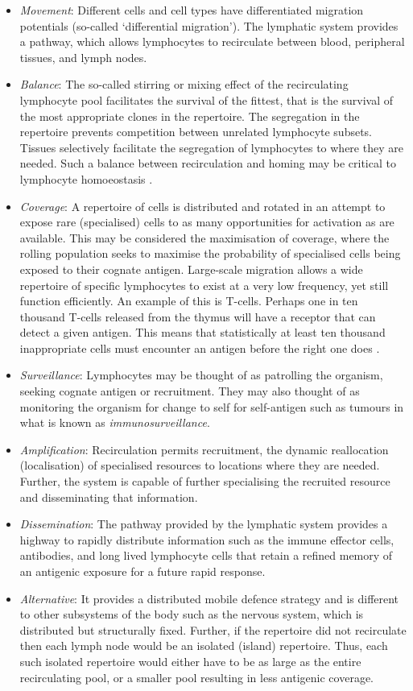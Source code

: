 \begin{itemize}
	\item \emph{Movement}: Different cells and cell types have differentiated migration potentials (so-called `differential migration'). The lymphatic system provides a pathway, which allows lymphocytes to recirculate between blood, peripheral tissues, and lymph nodes.
	\item \emph{Balance}: The so-called stirring or mixing effect of the recirculating lymphocyte pool facilitates the survival of the fittest, that is the survival of the most appropriate clones in the repertoire. The segregation in the repertoire prevents competition between unrelated lymphocyte subsets. Tissues selectively facilitate the segregation of lymphocytes to where they are needed. Such a balance between recirculation and homing may be critical to lymphocyte homoeostasis \cite{Butcher1996}.
	\item \emph{Coverage}: A repertoire of cells is distributed and rotated in an attempt to expose rare (specialised) cells to as many opportunities for activation as are available. This may be considered the maximisation of coverage, where the rolling population seeks to maximise the probability of specialised cells being exposed to their cognate antigen. Large-scale migration allows a wide repertoire of specific lymphocytes to exist at a very low frequency, yet still function efficiently. An example of this is T-cells. Perhaps one in ten thousand T-cells released from the thymus will have a receptor that can detect a given antigen. This means that statistically at least ten thousand inappropriate cells must encounter an antigen before the right one does \cite{Anderson1990a}. 
	\item \emph{Surveillance}: Lymphocytes may be thought of as patrolling the organism, seeking cognate antigen or recruitment. They may also thought of as monitoring the organism for change to self for self-antigen such as tumours in what is known as \emph{immunosurveillance}.
	\item \emph{Amplification}: Recirculation permits recruitment, the dynamic reallocation (localisation) of specialised resources to locations where they are needed. Further, the system is capable of further specialising the recruited resource and disseminating that information.
	\item \emph{Dissemination}: The pathway provided by the lymphatic system provides a highway to rapidly distribute information such as the immune effector cells, antibodies, and long lived lymphocyte cells that retain a refined memory of an antigenic exposure for a future rapid response.
	\item \emph{Alternative}: It provides a distributed mobile defence strategy and is different to other subsystems of the body such as the nervous system, which is distributed but structurally fixed. Further, if the repertoire did not recirculate then each lymph node would be an isolated (island) repertoire. Thus, each such isolated repertoire would either have to be as large as the entire recirculating pool, or a smaller pool resulting in less antigenic coverage.
\end{itemize}

